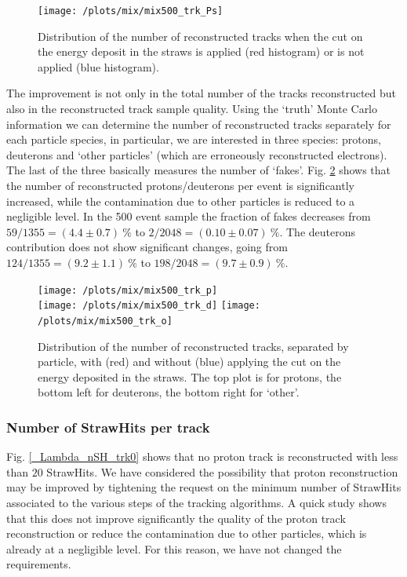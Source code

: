 \documentclass[12pt,a4paper,openright, oneside, titlepage]{book} %
\begin{document}
\begin{figure}[!htb]
\centering
\texttt{[image: /plots/mix/mix500\_trk\_Ps]}
\caption[Number of tracks with and without the cut on the StrawHit energy]
{Distribution of the number of reconstructed tracks when the cut on the energy deposit 
in the straws is applied (red histogram) or is not applied (blue histogram).}
\label{_mix_proton_trk}
\end{figure}

\noindent The improvement is not only in the total number of the tracks reconstructed but also in the reconstructed track sample quality. 
Using the `truth' Monte Carlo information we can determine the number of reconstructed tracks separately for each particle species, in particular, we are interested in three species: protons, deuterons and `other particles' (which are erroneously reconstructed electrons).
The last of the three basically measures the number of `fakes'.
Fig. \ref{_mix_pdgID_trk} shows that the number of reconstructed protons/deuterons per event is significantly increased, while the contamination due to other particles is reduced to a negligible level.
In the 500 event sample the fraction of fakes decreases from $59/1355=(4.4\pm0.7)\ \%$ to $2/2048=(0.10\pm0.07)\ \%$.
The deuterons contribution does not show significant changes, going from $124/1355= (9.2\pm1.1)\ \%$  to $198/2048=(9.7\pm0.9)\ \%$.

\begin{figure}[!htb]
\centering
\texttt{[image: /plots/mix/mix500\_trk\_p]}\\
\texttt{[image: /plots/mix/mix500\_trk\_d]}
\texttt{[image: /plots/mix/mix500\_trk\_o]}
\caption[Number of tracks from different particles]
{Distribution of the number of reconstructed tracks, separated by particle, 
with (red) and without (blue) applying the cut on the energy deposited in the straws. 
The top plot is for protons, the bottom left for deuterons, the bottom right for `other'.}
\label{_mix_pdgID_trk}
\end{figure}

\subsubsection{Number of StrawHits per track}
Fig. \ref{_Lambda_nSH_trk0} shows that no proton track is reconstructed with less than $20$ StrawHits.
We have considered the possibility that proton reconstruction may be improved by tightening the
request on the minimum number of StrawHits associated to the various steps of the tracking algorithms.
A quick study shows that this does not improve significantly the quality of the proton track reconstruction or reduce the contamination due to other particles, which is already at a negligible level. 
For this reason, we have not changed the requirements.\\
\end{document}
